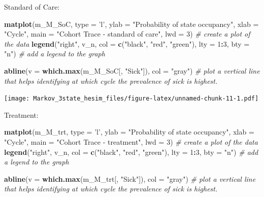 \documentclass[
]{article}
\newenvironment{Shaded}{\begin{snugshade}}{\end{snugshade}}
\newcommand{\CommentTok}[1]{\textcolor[rgb]{0.56,0.35,0.01}{\textit{#1}}}
\newcommand{\DataTypeTok}[1]{\textcolor[rgb]{0.13,0.29,0.53}{#1}}
\newcommand{\DecValTok}[1]{\textcolor[rgb]{0.00,0.00,0.81}{#1}}
\newcommand{\KeywordTok}[1]{\textcolor[rgb]{0.13,0.29,0.53}{\textbf{#1}}}
\newcommand{\NormalTok}[1]{#1}
\newcommand{\OperatorTok}[1]{\textcolor[rgb]{0.81,0.36,0.00}{\textbf{#1}}}
\newcommand{\StringTok}[1]{\textcolor[rgb]{0.31,0.60,0.02}{#1}}
\begin{document}
Standard of Care:

\begin{Shaded}
\begin{Highlighting}[]
\KeywordTok{matplot}\NormalTok{(m_M_SoC, }\DataTypeTok{type =} \StringTok{'l'}\NormalTok{, }
        \DataTypeTok{ylab =} \StringTok{"Probability of state occupancy"}\NormalTok{,}
        \DataTypeTok{xlab =} \StringTok{"Cycle"}\NormalTok{,}
        \DataTypeTok{main =} \StringTok{"Cohort Trace - standard of care"}\NormalTok{, }\DataTypeTok{lwd =} \DecValTok{3}\NormalTok{)  }\CommentTok{# create a plot of the data}
\KeywordTok{legend}\NormalTok{(}\StringTok{"right"}\NormalTok{, v_n, }\DataTypeTok{col =} \KeywordTok{c}\NormalTok{(}\StringTok{"black"}\NormalTok{, }\StringTok{"red"}\NormalTok{, }\StringTok{"green"}\NormalTok{), }
       \DataTypeTok{lty =} \DecValTok{1}\OperatorTok{:}\DecValTok{3}\NormalTok{, }\DataTypeTok{bty =} \StringTok{"n"}\NormalTok{)                            }\CommentTok{# add a legend to the graph}

\KeywordTok{abline}\NormalTok{(}\DataTypeTok{v =} \KeywordTok{which.max}\NormalTok{(m_M_SoC[, }\StringTok{"Sick"}\NormalTok{]), }\DataTypeTok{col =} \StringTok{"gray"}\NormalTok{)      }\CommentTok{# plot a vertical line that helps identifying at which cycle the prevalence of sick is highest.  }
\end{Highlighting}
\end{Shaded}

\texttt{[image: Markov\_3state\_hesim\_files/figure-latex/unnamed-chunk-11-1.pdf]}

Treatment:

\begin{Shaded}
\begin{Highlighting}[]
\KeywordTok{matplot}\NormalTok{(m_M_trt, }\DataTypeTok{type =} \StringTok{'l'}\NormalTok{, }
        \DataTypeTok{ylab =} \StringTok{"Probability of state occupancy"}\NormalTok{,}
        \DataTypeTok{xlab =} \StringTok{"Cycle"}\NormalTok{,}
        \DataTypeTok{main =} \StringTok{"Cohort Trace - treatment"}\NormalTok{, }\DataTypeTok{lwd =} \DecValTok{3}\NormalTok{)     }\CommentTok{# create a plot of the data}
\KeywordTok{legend}\NormalTok{(}\StringTok{"right"}\NormalTok{, v_n, }\DataTypeTok{col =} \KeywordTok{c}\NormalTok{(}\StringTok{"black"}\NormalTok{, }\StringTok{"red"}\NormalTok{, }\StringTok{"green"}\NormalTok{), }
       \DataTypeTok{lty =} \DecValTok{1}\OperatorTok{:}\DecValTok{3}\NormalTok{, }\DataTypeTok{bty =} \StringTok{"n"}\NormalTok{)                            }\CommentTok{# add a legend to the graph}

\KeywordTok{abline}\NormalTok{(}\DataTypeTok{v =} \KeywordTok{which.max}\NormalTok{(m_M_trt[, }\StringTok{"Sick"}\NormalTok{]), }\DataTypeTok{col =} \StringTok{"gray"}\NormalTok{)      }\CommentTok{# plot a vertical line that helps identifying at which cycle the prevalence of sick is highest.  }
\end{Highlighting}
\end{Shaded}
\end{document}

